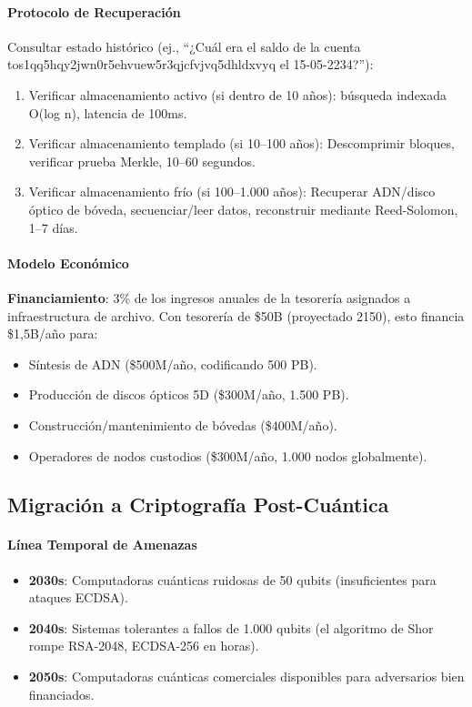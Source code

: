 \documentclass[11pt]{article}
\begin{document}
\paragraph{Protocolo de Recuperación}
Consultar estado histórico (ej., ``¿Cuál era el saldo de la cuenta tos1qq5hqy2jwn0r5ehvuew5r3qjcfvjvq5dhldxvyq el 15-05-2234?''):
\begin{enumerate}[noitemsep]
  \item Verificar almacenamiento activo (si dentro de 10 años): búsqueda indexada O(log n), latencia de 100ms.
  \item Verificar almacenamiento templado (si 10--100 años): Descomprimir bloques, verificar prueba Merkle, 10--60 segundos.
  \item Verificar almacenamiento frío (si 100--1.000 años): Recuperar ADN/disco óptico de bóveda, secuenciar/leer datos, reconstruir mediante Reed-Solomon, 1--7 días.
\end{enumerate}

\paragraph{Modelo Económico}
\textbf{Financiamiento}: 3\% de los ingresos anuales de la tesorería asignados a infraestructura de archivo. Con tesorería de \$50B (proyectado 2150), esto financia \$1,5B/año para:
\begin{itemize}[noitemsep]
  \item Síntesis de ADN (\$500M/año, codificando 500 PB).
  \item Producción de discos ópticos 5D (\$300M/año, 1.500 PB).
  \item Construcción/mantenimiento de bóvedas (\$400M/año).
  \item Operadores de nodos custodios (\$300M/año, 1.000 nodos globalmente).
\end{itemize}

\subsection{Migración a Criptografía Post-Cuántica}

\paragraph{Línea Temporal de Amenazas}
\begin{itemize}[noitemsep]
  \item \textbf{2030s}: Computadoras cuánticas ruidosas de 50 qubits (insuficientes para ataques ECDSA).
  \item \textbf{2040s}: Sistemas tolerantes a fallos de 1.000 qubits (el algoritmo de Shor rompe RSA-2048, ECDSA-256 en horas).
  \item \textbf{2050s}: Computadoras cuánticas comerciales disponibles para adversarios bien financiados.
\end{itemize}
\end{document}
